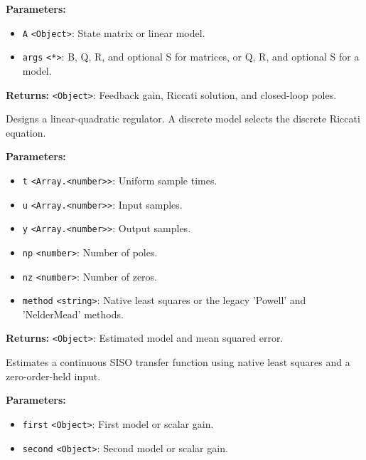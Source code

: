 \documentclass[12pt,a4paper]{article}
\begin{document}
\noindent \textbf{Parameters:}
\begin{itemize}
  \item \texttt{A} \texttt{<Object>}: State matrix or linear model.
  \item \texttt{args} \texttt{<*>}: B, Q, R, and optional S for matrices, or Q, R, and optional S for a model.
\end{itemize}

\noindent \textbf{Returns:} \texttt{<Object>}: Feedback gain, Riccati solution, and closed-loop poles.

\noindent Designs a linear-quadratic regulator. A discrete model selects the discrete Riccati equation.

\vspace{5mm}
\noindent {}


\noindent \textbf{Parameters:}
\begin{itemize}
  \item \texttt{t} \texttt{<Array.<number>>}: Uniform sample times.
  \item \texttt{u} \texttt{<Array.<number>>}: Input samples.
  \item \texttt{y} \texttt{<Array.<number>>}: Output samples.
  \item \texttt{np} \texttt{<number>}: Number of poles.
  \item \texttt{nz} \texttt{<number>}: Number of zeros.
  \item \texttt{method} \texttt{<string>}: Native least squares or the legacy 'Powell' and 'NelderMead' methods.
\end{itemize}

\noindent \textbf{Returns:} \texttt{<Object>}: Estimated model and mean squared error.

\noindent Estimates a continuous SISO transfer function using native least squares and a zero-order-held input.

\vspace{5mm}
\noindent {}


\noindent \textbf{Parameters:}
\begin{itemize}
  \item \texttt{first} \texttt{<Object>}: First model or scalar gain.
  \item \texttt{second} \texttt{<Object>}: Second model or scalar gain.
\end{itemize}
\end{document}
